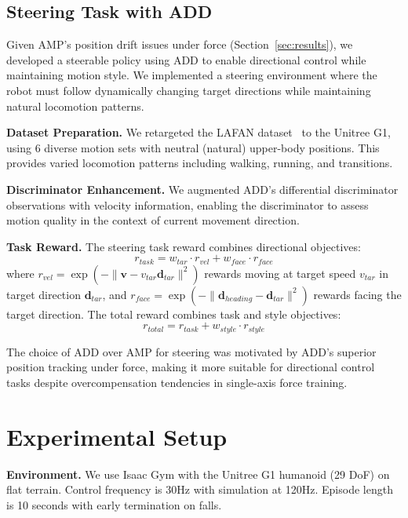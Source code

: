 \documentclass{article}
\begin{document}
\subsection{Steering Task with ADD}

Given AMP's position drift issues under force (Section~\ref{sec:results}), we developed a steerable policy using ADD to enable directional control while maintaining motion style. We implemented a steering environment where the robot must follow dynamically changing target directions while maintaining natural locomotion patterns.

\textbf{Dataset Preparation.} We retargeted the LAFAN dataset~\citep{harvey2020lafan} to the Unitree G1, using 6 diverse motion sets with neutral (natural) upper-body positions. This provides varied locomotion patterns including walking, running, and transitions.

\textbf{Discriminator Enhancement.} We augmented ADD's differential discriminator observations with velocity information, enabling the discriminator to assess motion quality in the context of current movement direction.

\textbf{Task Reward.} The steering task reward combines directional objectives:
\begin{equation}
r_{task} = w_{tar} \cdot r_{vel} + w_{face} \cdot r_{face}
\label{eq:steering_task}
\end{equation}
where $r_{vel} = \exp(-\|\mathbf{v} - v_{tar}\mathbf{d}_{tar}\|^2)$ rewards moving at target speed $v_{tar}$ in target direction $\mathbf{d}_{tar}$, and $r_{face} = \exp(-\|\mathbf{d}_{heading} - \mathbf{d}_{tar}\|^2)$ rewards facing the target direction. The total reward combines task and style objectives:
\begin{equation}
r_{total} = r_{task} + w_{style} \cdot r_{style}
\label{eq:total_reward}
\end{equation}

The choice of ADD over AMP for steering was motivated by ADD's superior position tracking under force, making it more suitable for directional control tasks despite overcompensation tendencies in single-axis force training.

\section{Experimental Setup}

\textbf{Environment.} We use Isaac Gym with the Unitree G1 humanoid (29 DoF) on flat terrain. Control frequency is 30Hz with simulation at 120Hz. Episode length is 10 seconds with early termination on falls.
\end{document}

